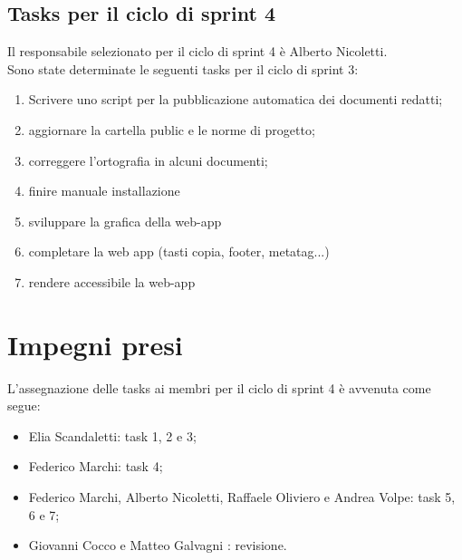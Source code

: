 \documentclass[a4paper, 12pt]{article}
\begin{document}
\subsection{Tasks per il ciclo di sprint 4}
Il responsabile selezionato per il ciclo di sprint 4 è Alberto Nicoletti. \\
Sono state determinate le seguenti tasks per il ciclo di sprint 3:
\begin{enumerate}
    \item Scrivere uno script per la pubblicazione automatica dei documenti redatti;
    \item aggiornare la cartella public e le norme di progetto;
    \item correggere l'ortografia in alcuni documenti;
	\item finire manuale installazione
	\item sviluppare la grafica della web-app
	\item completare la web app (tasti copia, footer, metatag...)
	\item rendere accessibile la web-app
\end{enumerate}

\section{Impegni presi}
L'assegnazione delle tasks ai membri per il ciclo di sprint 4 è avvenuta come segue:
\begin{itemize}
	\item Elia Scandaletti: task 1, 2 e 3;
	\item Federico Marchi: task 4;
	\item Federico Marchi, Alberto Nicoletti, Raffaele Oliviero e Andrea Volpe: task 5, 6 e 7;
	\item Giovanni Cocco e Matteo Galvagni : revisione.
\end{itemize}
\end{document}

